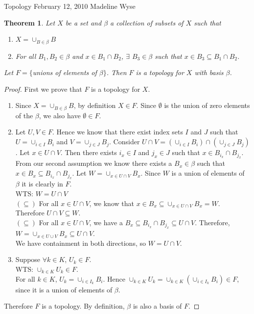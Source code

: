 \documentclass[10pt,reqno]{amsart}
\newtheorem{Theorem}{Theorem}
\newtheorem*{Small Fact}{Small Fact}
\newtheorem*{Small Fact about Basis}{Small Fact about Basis}
\newtheorem*{Tiny Fact about Projection Maps}{Tiny Fact about Projection Maps}
\theoremstyle{definition}
\newtheorem{PART II: Creating News Spaces from Old Spaces}{PART II: Creating News Spaces from Old Spaces}
\begin{document}
\center
\huge{Topology}
February 12, 2010
\normalsize
Madeline Wyse
\begin{Theorem}
Let $X$ be a set and $\beta$ a collection of subsets of $X$ such that
\begin{enumerate}
	\item $X = \cup_{B \in \beta} B$
	\item For all $B_1, B_2 \in \beta$ and $x \in B_1 \cap B_2$, $\exists$ $B_3 \in \beta$ such that $x \in B_3 \subseteq B_1 \cap B_2$.
\end{enumerate}
Let $F = \{$unions of elements of $\beta \}$. Then $F$ is a topology for $X$ with basis $\beta$. 
\end{Theorem}

\begin{proof}
First we prove that $F$ is a topology for $X$. 
\begin{enumerate}
	\item Since $X = \displaystyle{\cup_{B \in \beta} B}$, by definition $X \in F$. Since $\emptyset$ is the union of zero elements of the $\beta$, we also have $\emptyset \in F$. 
	\item Let $U, V \in F$. Hence we know that there exist index sets $I$ and $J$ such that $U = \cup_{i \in I}B_i$ and $V = \cup_{j \in J}B_j$. Consider $U \cap V = ( \cup_{i \in I}B_i) \cap (\cup_{j \in J}B_j)$. Let $x \in  U \cap V$. Then there exists $i_x \in I$ and $j_x \in J$ such that $x \in B_{i_x} \cap B_{j_x}$. From our second assumption we know there exists a $B_x \in \beta$ such that $x \in B_x \subseteq B_{i_x} \cap B_{j_x}$. Let $W = \cup_{x \in U \cap V} B_x$. Since $W$ is a union of elements of $\beta$ it is clearly in $F$. \\
WTS: $W = U \cap V$\\
$(\subseteq)$ For all $x \in U \cap V$, we know that $x \in B_x \subseteq \cup_{x \in U \cap V}B_x = W$. Therefore $U \cap V \subseteq W$. \\
$(\subseteq)$ For all $x \in U \cap V$, we have a $B_x \subseteq B_{i_x} \cap B_{j_x} \subseteq U \cap V$. Therefore, $W = \cup_{x \in U \cup V} B_x \subseteq U \cap V$.\\
We have containment in both directions, so  $W = U \cap V$. 
	\item Suppose $\forall k \in K$, $U_k \in F$. \\
	WTS: $\cup_{k \in K}U_k \in F$. \\
	For all $k \in K$, $U_k = \cup_{i \in I_k} B_i$. Hence $\cup_{k \in K}U_k = \cup_{k \in K} (\cup_{i \in I_k} B_i) \in F$, since it is a union of elements of $\beta$. 
\end{enumerate}
Therefore $F$ is a topology. By definition, $\beta$ is also a basis of $F$. 
\end{proof}
\end{document}
